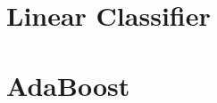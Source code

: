 \documentclass{article}
\begin{document}
    \section{Linear Classifier}

    \section{AdaBoost}
            
\end{document}
